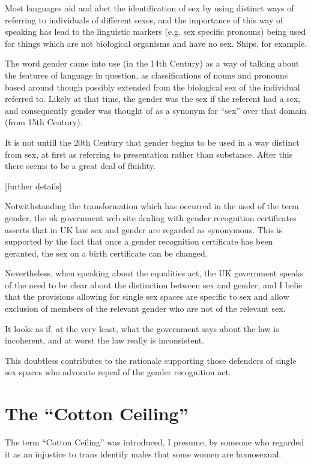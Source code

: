 \documentclass[10pt,titlepage]{article}
\begin{document}
Most languages aid and abet the identification of sex by using distinct ways of referring to individuals of different sexes, and the importance of this way of speaking has lead to the linguistic markers (e.g. sex specific pronouns) being used for things which are not biological organisms and have no sex.
Ships, for example.

The word gender came into use (in the 14th Century) as a way of talking about the features of language in question, as classifications of nouns and pronouns based around though possibly extended from the biological sex of the individual referred to.
Likely at that time, the gender was the sex if the referent had a sex, and consequently gender was thought of as a synonym for ``sex'' over that domain (from 15th Century).

It is not untill the 20th Century that gender begins to be used in a way distinct from sex, at first as referring to presentation rather than substance.
After this there seems to be a great deal of fluidity.

[further details]

Notwithstanding the transformation which has occurred in the used of the term gender, the uk government web site dealing with gender recognition certificates asserts that in UK law sex and gender are regarded as synonymous.
This is supported by the fact that once a gender recognition certificate has been geranted, the sex on a birth certificate can be changed.

Nevertheless, when speaking about the equalities act, the UK government speaks of the need to be clear about the distinction between sex and gender, and I belie that the provisions allowing for single sex spaces are specific to sex and allow exclusion of members of the relevant gender who are not of the relevant sex.

It looks as if, at the very least, what the government says about the law is incoherent, and at worst the law really is inconsistent.

This doubtless contributes to the rationale supporting those defenders of single sex spaces who advocate repeal of the gender recognition act.

\section{The ``Cotton Ceiling''}

The term ``Cotton Ceiling'' was introduced, I presume, by someone who regarded it as an injustice to trans identify males that some women are homosexual.
\end{document}
